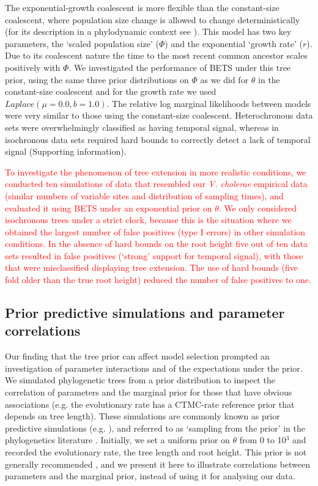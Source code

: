 \documentclass[10pt,letterpaper]{article}
\begin{document}
The exponential-growth coalescent is more flexible than the constant-size coalescent, where population size change is allowed to change deterministically (for its description in a phylodynamic context see \cite{volz2012complex, dearlove2013coalescent}). This model has two key parameters, the `scaled population size' ($\Phi$) and the exponential `growth rate' ($r$). Due to its coalescent nature the time to the most recent common ancestor scales positively with $\Phi$. We investigated the performance of BETS under this tree prior, using the same three prior distributions on $\Phi$ as we did for $\theta$ in the constant-size coalescent and for the growth rate we used $Laplace(\mu=0.0, b=1.0)$. The relative log marginal likelihoods between models were very similar to those using the constant-size coalescent. Heterochronous data sets were overwhelmingly classified as having temporal signal, whereas in isochronous data sets required hard bounds to correctly detect a lack of temporal signal (Supporting information). 

\textcolor{red}{To investigate the phenomenon of tree extension in more realistic conditions, we conducted ten simulations of data that resembled our \textit{V. cholerae} empirical data (similar numbers of variable sites and distribution of sampling times), and evaluated it using BETS under an exponential prior on $\theta$. We only considered isochronous trees under a strict clock, because this is the situation where we obtained the largest number of false positives (type I errors) in other simulation conditions. In the absence of hard bounds on the root height five out of ten data sets resulted in false positives (`strong' support for temporal signal), with those that were misclassified displaying tree extension. The use of hard bounds (five fold older than the true root height) reduced the number of false positives to one.} 

\subsection*{Prior predictive simulations and parameter correlations}
Our finding that the tree prior can affect model selection prompted an investigation of parameter interactions and of the expectations under the prior. We simulated phylogenetic trees from a prior distribution to inspect the correlation of parameters and the marginal prior for those that have obvious associations (e.g. the evolutionary rate has a CTMC-rate reference prior that depends on tree length). These simulations are commonly known as prior predictive simulations (e.g. \cite{wesner2021choosing}), and referred to as `sampling from the prior' in the phylogenetics literature \cite{nascimento2017biologist}. Initially, we set a uniform prior on $\theta$ from 0 to 10$^3$ and recorded the evolutionary rate, the tree length and root height. This prior is not generally recommended \cite{bouckaertDating}, and we present it here to illustrate correlations between parameters and the marginal prior, instead of using it for analysing our data.
\end{document}

